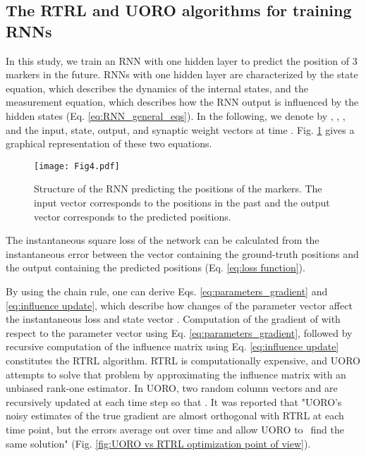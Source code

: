 \documentclass[twocolumn,a4paper]{svjour3} \sloppy          \smartqed
\begin{document}
\subsection{The RTRL and UORO algorithms for training RNNs}

In this study, we train an RNN with one hidden layer to predict the position of 3 markers in the future. RNNs with one hidden layer are characterized by the state equation, which describes the dynamics of the internal states, and the measurement equation, which describes how the RNN output is influenced by the hidden states (Eq. \ref{eq:RNN_general_eqs}). In the following, we denote by , , , and  the input, state, output, and synaptic weight vectors at time . Fig. \ref{fig:rnn_structure} gives a graphical representation of these two equations.



\begin{figure} [htb!]
	\centering
\texttt{[image: Fig4.pdf]}
	\caption{Structure of the RNN predicting the positions of the markers. The input vector \text{\normalsize }  corresponds to the positions in the past and the output vector \text{\normalsize } corresponds to the predicted positions\protect\footnotemark  .}
	\label{fig:rnn_structure}
\end{figure}


The instantaneous square loss  of the network can be calculated from the instantaneous error  between the vector  containing the ground-truth positions and the output  containing the predicted positions (Eq. \ref{eq:loss function}).    



By using the chain rule, one can derive Eqs. \ref{eq:parameters_gradient} and \ref{eq:influence update}, which describe how changes of the parameter vector  affect the instantaneous loss  and state vector . Computation of the gradient of  with respect to the parameter vector using Eq. \ref{eq:parameters_gradient}, followed by recursive computation of the influence matrix  using Eq. \ref{eq:influence update} constitutes the RTRL algorithm. RTRL is computationally expensive, and UORO attempts to solve that problem by approximating the influence matrix with an unbiased rank-one estimator. In UORO, two random column vectors  and  are recursively updated at each time step so that . It was reported that "UORO's noisy estimates of the true gradient are almost orthogonal with RTRL at each time point, but the errors average out over time and allow UORO \mbox{to find} the same solution" \cite{marschall2020unified} (Fig. \ref{fig:UORO vs RTRL optimization point of view}).
\end{document}
